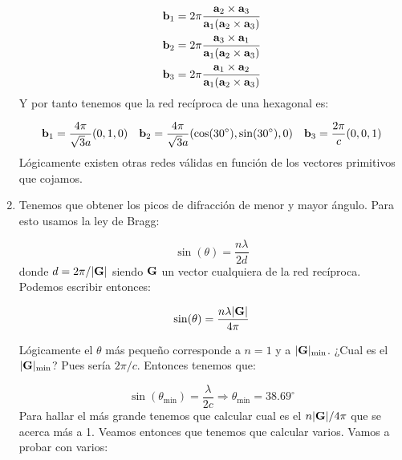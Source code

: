 \begin{solucion}
\begin{enumerate}[label=\alph*)]
		\begin{equation*}
			\begin{split}    
				\mathbf{b}_1 & = 2 \pi \frac{\mathbf{a}_2 \times \mathbf{a}_3}{\mathbf{a}_1 (\mathbf{a}_2 \times \mathbf{a}_3)} \\
				\mathbf{b}_2 & = 2 \pi \frac{\mathbf{a}_3 \times \mathbf{a}_1}{\mathbf{a}_1 (\mathbf{a}_2 \times \mathbf{a}_3)}  \\
				\mathbf{b}_3 & = 2 \pi \frac{\mathbf{a}_1 \times \mathbf{a}_2}{\mathbf{a}_1 (\mathbf{a}_2 \times \mathbf{a}_3)}
			\end{split} \label{Ec:02-01-04}
		\end{equation*}
		Y por tanto tenemos que la red recíproca de una hexagonal es:
		
		\begin{equation*}
			\mathbf{b}_1 =  \frac{4 \pi}{\sqrt{3}a} (0,1,0) \quad
			\mathbf{b}_2 =  \frac{4 \pi}{\sqrt{3}a} (\cos(30^\circ),\sin(30^\circ),0) \quad
			\mathbf{b}_3 = \frac{2 \pi }{c} (0,0,1)
		\end{equation*}
		Lógicamente existen otras redes válidas en función de los vectores primitivos que cojamos.
		\item Tenemos que obtener los picos de difracción de menor y mayor ángulo. Para esto usamos la ley de Bragg:
		
		\begin{equation*}
			\sin (\theta) = \frac{n\lambda}{2d}
		\end{equation*}
		donde $d=2\pi / |\mathbf{G}|$ siendo $\mathbf{G}$ un vector cualquiera de la red recíproca. Podemos escribir entonces:
		
		\begin{equation*}
			\sin (\theta) = \frac{n\lambda |\mathbf{G}|}{4\pi}
		\end{equation*}
		
		
		 Lógicamente el $\theta$ más pequeño corresponde a $n=1$ y a $|\mathbf{G}|_{\min}$. ¿Cual es el $|\mathbf{G}|_{\min}$? Pues sería $2\pi/c$. Entonces tenemos que:
		
		\begin{equation*}
			\sin (\theta_{\min}) = \frac{\lambda}{2c} \Rightarrow  \theta_{\min} = 38.69^\circ
		\end{equation*}
		Para hallar el más grande tenemos que calcular cual es el $n|\mathbf{G}|/4\pi$ que se acerca más a 1. Veamos entonces que tenemos que calcular varios. Vamos a probar con varios:
		

\end{enumerate}
\end{solucion}
